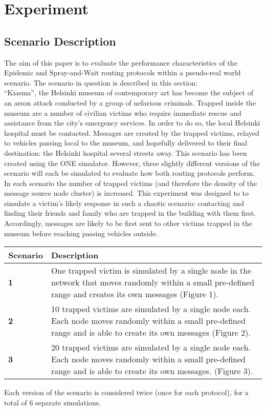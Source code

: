 \documentclass{article}
\begin{document}
\section{Experiment}
\subsection{Scenario Description}
The aim of this paper is to evaluate the performance characteristics of the Epidemic and Spray-and-Wait routing protocols within a pseudo-real world scenario. The scenario in question is described in this section:\\
\newline ``Kiasma'', the Helsinki museum of contemporary art has become the subject of an arson attack conducted by a group of nefarious criminals. Trapped inside the museum are a number of civilian victims who require immediate rescue and assistance from the city's emergency services. In order to do so, the local Helsinki hospital must be contacted. Messages are created by the trapped victims, relayed to vehicles passing local to the museum, and hopefully delivered to their final destination: the Helsinki hospital several streets away.
This scenario has been created using the ONE simulator. However, three slightly different versions of the scenario will each be simulated to evaluate how both routing protocols perform. In each scenario the number of trapped victims (and therefore the density of the message source node cluster) is increased. This experiment was designed to to simulate a victim's likely response in such a chaotic scenario: contacting and finding their friends and family who are trapped in the building with them first. Accordingly, messages are likely to be first sent to other victims trapped in the museum before reaching passing vehicles outside.

\begin{center}
\begin{tabular}{|l|p{13cm}|}
\hline
\textbf{Scenario} & \textbf{Description} \\ \hline
\textbf{1} & One trapped victim is simulated by a single node in the network that moves randomly within a small pre-defined range and creates its own messages (Figure 1). \\ \hline
\textbf{2} & 10 trapped victims are simulated by a single node each. Each node moves randomly within a small pre-defined range and is able to create its own messages (Figure 2). \\ \hline
\textbf{3} & 20 trapped victims are simulated by a single node each. Each node moves randomly within a small pre-defined range and is able to create its own messages. (Figure 3). \\ \hline
\end{tabular}
\end{center}
\noindent Each version of the scenario is considered twice (once for each protocol), for a total of 6 separate simulations.
\end{document}
